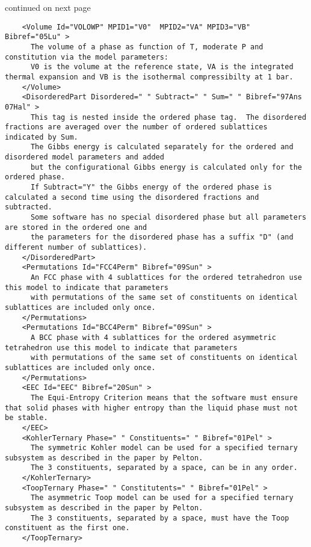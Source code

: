 \documentclass{article}
\begin{document}
\begin{appendices}
\bigskip
continued on next page

\newpage
{\small
\begin{verbatim}
    <Volume Id="VOLOWP" MPID1="V0"  MPID2="VA" MPID3="VB" Bibref="05Lu" > 
      The volume of a phase as function of T, moderate P and constitution via the model parameters:
      V0 is the volume at the reference state, VA is the integrated thermal expansion and VB is the isothermal compressibilty at 1 bar.
    </Volume>
    <DisorderedPart Disordered=" " Subtract=" " Sum=" " Bibref="97Ans 07Hal" > 
      This tag is nested inside the ordered phase tag.  The disordered fractions are averaged over the number of ordered sublattices indicated by Sum.
      The Gibbs energy is calculated separately for the ordered and disordered model parameters and added 
      but the configurational Gibbs energy is calculated only for the ordered phase.
      If Subtract="Y" the Gibbs energy of the ordered phase is calculated a second time using the disordered fractions and subtracted.
      Some software has no special disordered phase but all parameters are stored in the ordered one and
      the parameters for the disordered phase has a suffix "D" (and different number of sublattices).
    </DisorderedPart>
    <Permutations Id="FCC4Perm" Bibref="09Sun" > 
      An FCC phase with 4 sublattices for the ordered tetrahedron use this model to indicate that parameters 
      with permutations of the same set of constituents on identical sublattices are included only once.
    </Permutations>
    <Permutations Id="BCC4Perm" Bibref="09Sun" > 
      A BCC phase with 4 sublattices for the ordered asymmetric tetrahedron use this model to indicate that parameters 
      with permutations of the same set of constituents on identical sublattices are included only once.
    </Permutations>
    <EEC Id="EEC" Bibref="20Sun" > 
      The Equi-Entropy Criterion means that the software must ensure that solid phases with higher entropy than the liquid phase must not be stable. 
    </EEC>
    <KohlerTernary Phase=" " Constituents=" " Bibref="01Pel" > 
      The symmetric Kohler model can be used for a specified ternary subsystem as described in the paper by Pelton.
      The 3 constituents, separated by a space, can be in any order.
    </KohlerTernary>
    <ToopTernary Phase=" " Constitutents=" " Bibref="01Pel" > 
      The asymmetric Toop model can be used for a specified ternary subsystem as described in the paper by Pelton.
      The 3 constituents, separated by a space, must have the Toop constituent as the first one.
    </ToopTernary>

\end{verbatim}}
\end{appendices}
\end{document}
